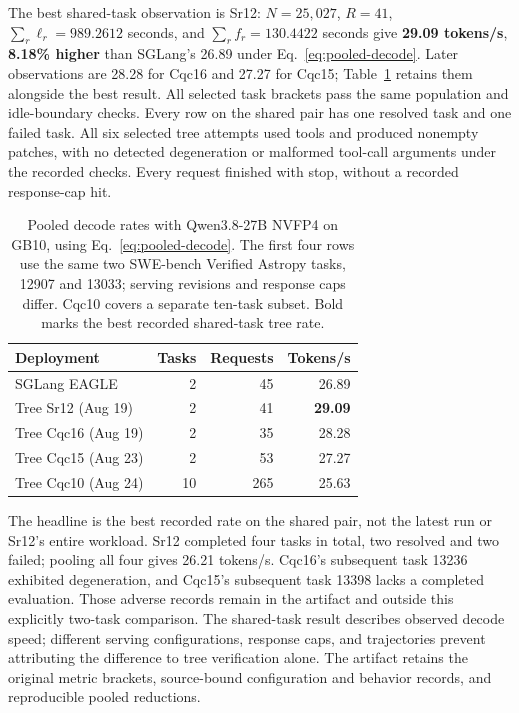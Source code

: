 The best shared-task observation is Sr12: $N=25{,}027$, $R=41$, $\sum_r\ell_r=989.2612$ seconds, and $\sum_r f_r=130.4422$ seconds give \textbf{29.09 tokens/s}, \textbf{8.18\% higher} than SGLang's 26.89 under Eq.~\ref{eq:pooled-decode}. Later observations are 28.28 for Cqc16 and 27.27 for Cqc15; Table~\ref{tab:pooled-decode} retains them alongside the best result. All selected task brackets pass the same population and idle-boundary checks. Every row on the shared pair has one resolved task and one failed task. All six selected tree attempts used tools and produced nonempty patches, with no detected degeneration or malformed tool-call arguments under the recorded checks. Every request finished with stop, without a recorded response-cap hit.

\begin{table}[t]
\caption{Pooled decode rates with Qwen3.8-27B NVFP4 on GB10, using Eq.~\ref{eq:pooled-decode}. The first four rows use the same two SWE-bench Verified Astropy tasks, 12907 and 13033; serving revisions and response caps differ. Cqc10 covers a separate ten-task subset. Bold marks the best recorded shared-task tree rate.}
\label{tab:pooled-decode}
\centering\small
\begin{tabular}{@{}lrrr@{}}
\toprule
Deployment & Tasks & Requests & Tokens/s \\
\midrule
SGLang EAGLE & 2 & 45 & 26.89 \\
Tree Sr12 (Aug 19) & 2 & 41 & \textbf{29.09} \\
Tree Cqc16 (Aug 19) & 2 & 35 & 28.28 \\
Tree Cqc15 (Aug 23) & 2 & 53 & 27.27 \\
\midrule
Tree Cqc10 (Aug 24) & 10 & 265 & 25.63 \\
\bottomrule
\end{tabular}
\end{table}

The headline is the best recorded rate on the shared pair, not the latest run or Sr12's entire workload. Sr12 completed four tasks in total, two resolved and two failed; pooling all four gives 26.21 tokens/s. Cqc16's subsequent task 13236 exhibited degeneration, and Cqc15's subsequent task 13398 lacks a completed evaluation. Those adverse records remain in the artifact and outside this explicitly two-task comparison. The shared-task result describes observed decode speed; different serving configurations, response caps, and trajectories prevent attributing the difference to tree verification alone. The artifact retains the original metric brackets, source-bound configuration and behavior records, and reproducible pooled reductions.

